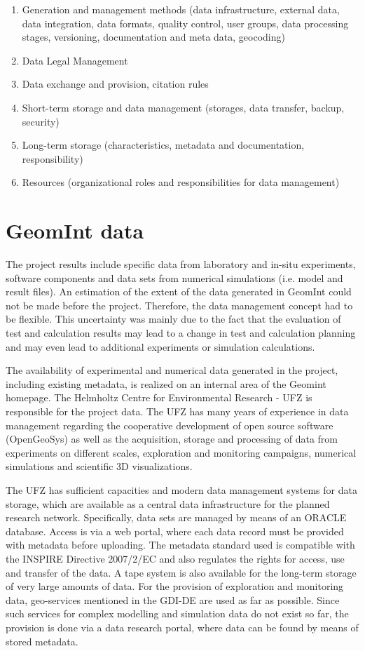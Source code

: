 \begin{enumerate}{\leftmargin=1em \itemindent=0em \itemsep=0.1em}
\item Generation and management methods (data infrastructure, external data, data integration, data formats, quality control, user groups, data processing stages, versioning, documentation and meta data, geocoding)
\item Data Legal Management
\item Data exchange and provision, citation rules
\item Short-term storage and data management (storages, data transfer, backup, security)
\item Long-term storage (characteristics, metadata and documentation, responsibility)
\item Resources (organizational roles and responsibilities for data management)
\end{enumerate}

\section{GeomInt data}

The project results include specific data from laboratory and in-situ experiments, software components and data sets from numerical simulations (i.e. model and result files). An estimation of the extent of the data generated in GeomInt could not be made before the project. Therefore, the data management concept had to be flexible. This uncertainty was mainly due to the fact that the evaluation of test and calculation results may lead to a change in test and calculation planning and may even lead to additional experiments or simulation calculations. 

The availability of experimental and numerical data generated in the project, including existing metadata, is realized on an internal area of the Geomint homepage. The Helmholtz Centre for Environmental Research - UFZ is responsible for the project data. The UFZ has many years of experience in data management regarding the cooperative development of open source software (OpenGeoSys) as well as the acquisition, storage and processing of data from experiments on different scales, exploration and monitoring campaigns, numerical simulations and scientific 3D visualizations. 

The UFZ has sufficient capacities and modern data management systems for data storage, which are available as a central data infrastructure for the planned research network. Specifically, data sets are managed by means of an ORACLE database. Access is via a web portal, where each data record must be provided with metadata before uploading. The metadata standard used is compatible with the INSPIRE Directive 2007/2/EC and also regulates the rights for access, use and transfer of the data. A tape system is also available for the long-term storage of very large amounts of data. For the provision of exploration and monitoring data, geo-services mentioned in the GDI-DE are used as far as possible. Since such services for complex modelling and simulation data do not exist so far, the provision is done via a data research portal, where data can be found by means of stored metadata.


